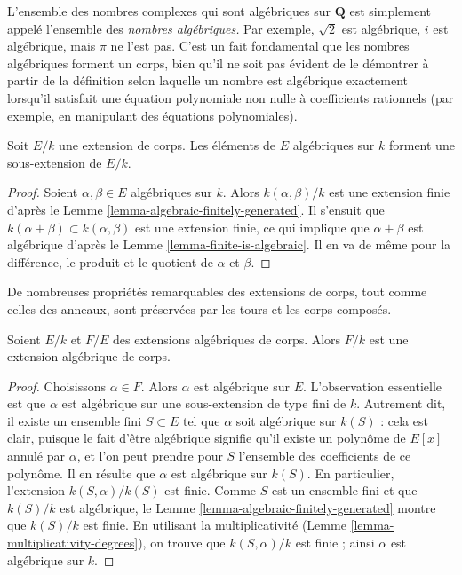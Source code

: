 \noindent
L'ensemble des nombres complexes qui sont algébriques sur $\mathbf{Q}$ est simplement
appelé l'ensemble des {\it nombres algébriques.} Par exemple, $\sqrt{2}$ est algébrique,
$i$ est algébrique, mais $\pi$ ne l'est pas.
C'est un fait fondamental que les nombres algébriques forment un corps, bien qu'il ne soit pas
évident de le démontrer à partir de la définition selon laquelle un nombre est algébrique
exactement lorsqu'il satisfait une équation polynomiale non nulle à coefficients
rationnels (par exemple, en manipulant des équations polynomiales).

\begin{lemma}
\label{lemma-algebraic-elements}
Soit $E/k$ une extension de corps. Les éléments de $E$ algébriques sur $k$
forment une sous-extension de $E/k$.
\end{lemma}

\begin{proof}
Soient $\alpha, \beta \in E$ algébriques sur $k$. Alors $k(\alpha, \beta)/k$
est une extension finie d'après le Lemme \ref{lemma-algebraic-finitely-generated}.
Il s'ensuit que $k(\alpha + \beta) \subset k(\alpha, \beta)$ est une extension
finie, ce qui implique que $\alpha + \beta$ est algébrique d'après le
Lemme \ref{lemma-finite-is-algebraic}. Il en va de même pour la différence,
le produit et le quotient de $\alpha$ et $\beta$.
\end{proof}

\noindent
De nombreuses propriétés remarquables des extensions de corps, tout comme celles des anneaux, sont
préservées par les tours et les corps composés.

\begin{lemma}
\label{lemma-algebraic-permanence}
Soient $E/k$ et $F/E$ des extensions algébriques de corps. Alors $F/k$ est une
extension algébrique de corps.
\end{lemma}

\begin{proof}
Choisissons $\alpha \in F$. Alors $\alpha$ est algébrique sur $E$.
L'observation essentielle est que $\alpha$ est algébrique sur une
sous-extension de type fini de $k$.
Autrement dit, il existe un ensemble fini $S \subset E$ tel que $\alpha $ soit algébrique
sur $k(S)$ : cela est clair, puisque le fait d'être algébrique signifie qu'il existe un
polynôme de $E[x]$ annulé par $\alpha$, et l'on peut prendre pour $S$ l'ensemble des
coefficients de ce polynôme. Il en résulte que $\alpha$ est algébrique sur
$k(S)$. En particulier, l'extension $k(S, \alpha)/ k(S)$ est finie.
Comme $S$ est un ensemble fini et que $k(S)/k$ est algébrique, le
Lemme \ref{lemma-algebraic-finitely-generated} montre que
$k(S)/k$ est finie. En utilisant la multiplicativité
(Lemme \ref{lemma-multiplicativity-degrees}),
on trouve que $k(S,\alpha)/k$ est finie ; ainsi $\alpha$ est algébrique sur $k$.
\end{proof}

